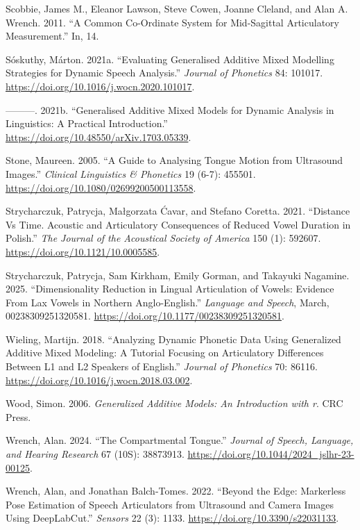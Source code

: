 \documentclass[
]{interact}
\newlength{\cslhangindent}
\newenvironment{CSLReferences}[2] %
 {\begin{list}{}{%
  \setlength{\itemindent}{0pt}
  \setlength{\leftmargin}{0pt}
  \setlength{\parsep}{0pt}
  \ifodd #1
   \setlength{\leftmargin}{\cslhangindent}
   \setlength{\itemindent}{-1\cslhangindent}
  \fi
  \setlength{\itemsep}{#2\baselineskip}}}
 {\end{list}}
\begin{document}
\begin{CSLReferences}{1}{0}
Scobbie, James M., Eleanor Lawson, Steve Cowen, Joanne Cleland, and Alan
A. Wrench. 2011. {``A Common Co-Ordinate System for Mid-Sagittal
Articulatory Measurement.''} In, 14.

Sóskuthy, Márton. 2021a. {``Evaluating Generalised Additive Mixed
Modelling Strategies for Dynamic Speech Analysis.''} \emph{Journal of
Phonetics} 84: 101017. \url{https://doi.org/10.1016/j.wocn.2020.101017}.

---------. 2021b. {``Generalised Additive Mixed Models for Dynamic
Analysis in Linguistics: A Practical Introduction.''}
\url{https://doi.org/10.48550/arXiv.1703.05339}.

Stone, Maureen. 2005. {``A Guide to Analysing Tongue Motion from
Ultrasound Images.''} \emph{Clinical Linguistics \& Phonetics} 19 (6-7):
455501. \url{https://doi.org/10.1080/02699200500113558}.

Strycharczuk, Patrycja, Małgorzata Ćavar, and Stefano Coretta. 2021.
{``Distance Vs Time. Acoustic and Articulatory Consequences of Reduced
Vowel Duration in Polish.''} \emph{The Journal of the Acoustical Society
of America} 150 (1): 592607. \url{https://doi.org/10.1121/10.0005585}.

Strycharczuk, Patrycja, Sam Kirkham, Emily Gorman, and Takayuki
Nagamine. 2025. {``Dimensionality Reduction in Lingual Articulation of
Vowels: Evidence From Lax Vowels in Northern Anglo-English.''}
\emph{Language and Speech}, March, 00238309251320581.
\url{https://doi.org/10.1177/00238309251320581}.

Wieling, Martijn. 2018. {``Analyzing Dynamic Phonetic Data Using
Generalized Additive Mixed Modeling: A Tutorial Focusing on Articulatory
Differences Between L1 and L2 Speakers of English.''} \emph{Journal of
Phonetics} 70: 86116. \url{https://doi.org/10.1016/j.wocn.2018.03.002}.

Wood, Simon. 2006. \emph{Generalized Additive Models: An Introduction
with r}. CRC Press.

Wrench, Alan. 2024. {``The Compartmental Tongue.''} \emph{Journal of
Speech, Language, and Hearing Research} 67 (10S): 38873913.
\url{https://doi.org/10.1044/2024_jslhr-23-00125}.

Wrench, Alan, and Jonathan Balch-Tomes. 2022. {``Beyond the Edge:
Markerless Pose Estimation of Speech Articulators from Ultrasound and
Camera Images Using DeepLabCut.''} \emph{Sensors} 22 (3): 1133.
\url{https://doi.org/10.3390/s22031133}.

\end{CSLReferences}
\end{document}
